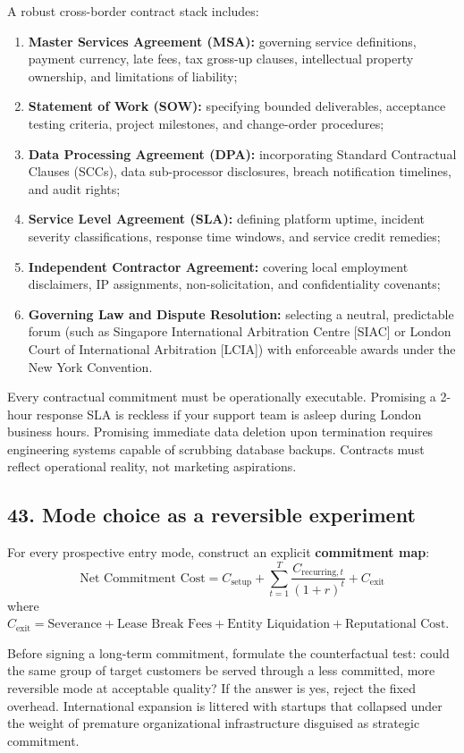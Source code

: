 A robust cross-border contract stack includes:
\begin{enumerate}
    \item \textbf{Master Services Agreement (MSA):} governing service definitions, payment currency, late fees, tax gross-up clauses, intellectual property ownership, and limitations of liability;
    \item \textbf{Statement of Work (SOW):} specifying bounded deliverables, acceptance testing criteria, project milestones, and change-order procedures;
    \item \textbf{Data Processing Agreement (DPA):} incorporating Standard Contractual Clauses (SCCs), data sub-processor disclosures, breach notification timelines, and audit rights;
    \item \textbf{Service Level Agreement (SLA):} defining platform uptime, incident severity classifications, response time windows, and service credit remedies;
    \item \textbf{Independent Contractor Agreement:} covering local employment disclaimers, IP assignments, non-solicitation, and confidentiality covenants;
    \item \textbf{Governing Law and Dispute Resolution:} selecting a neutral, predictable forum (such as Singapore International Arbitration Centre [SIAC] or London Court of International Arbitration [LCIA]) with enforceable awards under the New York Convention.
\end{enumerate}

Every contractual commitment must be operationally executable. Promising a 2-hour response SLA is reckless if your support team is asleep during London business hours. Promising immediate data deletion upon termination requires engineering systems capable of scrubbing database backups. Contracts must reflect operational reality, not marketing aspirations.

\subsection{43. Mode choice as a reversible experiment}

For every prospective entry mode, construct an explicit \textbf{commitment map}:
\begin{equation}
\text{Net Commitment Cost} = C_{\text{setup}} + \sum_{t=1}^{T} \frac{C_{\text{recurring}, t}}{(1+r)^t} + C_{\text{exit}}
\end{equation}
where $C_{\text{exit}} = \text{Severance} + \text{Lease Break Fees} + \text{Entity Liquidation} + \text{Reputational Cost}$.

Before signing a long-term commitment, formulate the counterfactual test: could the same group of target customers be served through a less committed, more reversible mode at acceptable quality? If the answer is yes, reject the fixed overhead. International expansion is littered with startups that collapsed under the weight of premature organizational infrastructure disguised as strategic commitment.
